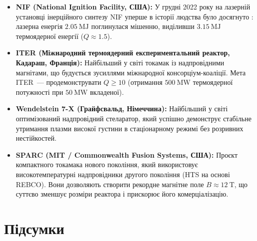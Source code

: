 \begin{itemize}
	\item \textbf{NIF (National Ignition Facility, США):} У грудні 2022 року на лазерній установці інерційного синтезу NIF уперше в історії людства було досягнуто : лазерна енергія $2.05~\mathrm{MJ}$ поглинулася мішенню, виділивши $3.15~\mathrm{MJ}$ термоядерної енергії ($Q \approx 1.5$).

	\item \textbf{ITER (Міжнародний термоядерний експериментальний реактор, Кадараш, Франція):} Найбільший у світі токамак із надпровідними магнітами, що будується зусиллями міжнародної консорціум-коаліції. Мета ITER~--- продемонструвати $Q \ge 10$ (отримання $500~\mathrm{MW}$ термоядерної потужності при $50~\mathrm{MW}$ вкладеної).

	\item \textbf{Wendelstein 7-X (Грайфсвальд, Німеччина):} Найбільший у світі оптимізований надпровідний стеларатор, який успішно демонструє стабільне утримання плазми високої густини в стаціонарному режимі без розривних нестійкостей.

	\item \textbf{SPARC (MIT / Commonwealth Fusion Systems, США):} Проєкт компактного токамака нового покоління, який використовує високотемпературні надпровідники другого покоління (HTS на основі REBCO). Вони дозволяють створити рекордне магнітне поле $B \approx 12~\mathrm{T}$, що суттєво зменшує розміри реактора і прискорює його комерціалізацію.
\end{itemize}

\section*{Підсумки}

